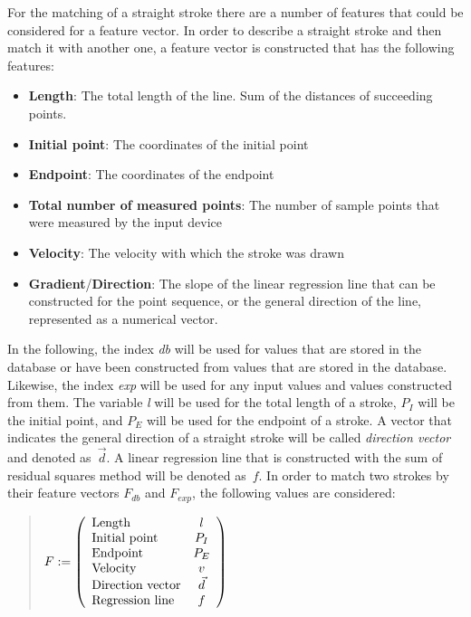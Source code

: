 For the matching of a straight stroke there are a number of features
that could be considered for a feature vector.
In order to describe a straight stroke and then match it with another one,
a feature vector is constructed that has the following features:
\begin{itemize}
  \item \textbf{Length}: The total length of the line. Sum of the distances of
        succeeding points.
  \item \textbf{Initial point}: The coordinates of the initial point
  \item \textbf{Endpoint}: The coordinates of the endpoint
  \item \textbf{Total number of measured points}: The number of sample
        points that were measured by the input device
  \item \textbf{Velocity}: The velocity with which the stroke was drawn
  \item \textbf{Gradient}/\textbf{Direction}: The slope of the linear 
  regression line that can be constructed for the point sequence, or
  the general direction of the line, represented as a numerical vector.
\end{itemize}
In the following, the index \emph{db} will be used for values that are
stored in the database or have been constructed from values that are stored
in the database. Likewise, the index \emph{exp} will be used for any 
input values and values constructed from them. The variable \emph{l} 
will be used for the total length of a stroke, \(P_{I}\) will be the 
initial point, and \(P_{E}\) will be used for the endpoint of a stroke. 
A vector that indicates the general direction of a straight stroke will be 
called \emph{direction vector} and denoted as~\(\vec{d}\). A linear regression 
line that is constructed with the sum of residual squares method 
will be denoted as~\(f\).
In order to match two strokes by their feature vectors \(F_{db} \) 
and \(F_{exp} \), the following values are considered:
\begin{quote}
\(
    F :=
    \left( 
    \begin {array} {l c} 
        \text{Length} & l \\
        \text{Initial point} & P_{I} \\
        \text{Endpoint} & P_{E} \\
        \text{Velocity} & v \\
        \text{Direction vector} & \vec{d} \\
        \text{Regression line} & f \\
    \end {array} 
    \right)
\)
\end{quote}
